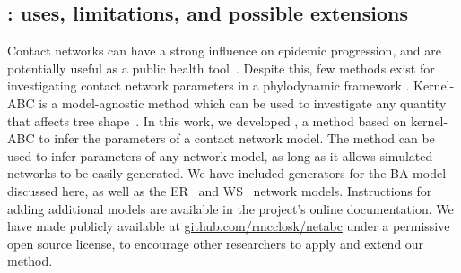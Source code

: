 
\label{sec:disc}

\subsection{: uses, limitations, and possible extensions}


Contact networks can have a strong influence on epidemic progression, and are
potentially useful as a public health tool~\autocite{wang2015targeting,
little2014using}. Despite this, few methods exist for investigating contact
network parameters in a phylodynamic framework \autocite[although see][for
related work]{groendyke2011bayesian, volz2008sir, brown2011transmission,
leventhal2012inferring, greenbaum2016inference}. Kernel-ABC is a model-agnostic
method which can be used to investigate any quantity that affects tree
shape~\autocite{poon2015phylodynamic}. In this work, we developed
, a method based on kernel-ABC to infer the parameters of a
contact network model. The method  can be used
to infer parameters of any network model, as long as it allows simulated
networks to be easily generated. We have included generators for the \gls{BA}
model discussed here, as well as the \gls{ER}~\autocite{erdos1960evolution} and
\gls{WS}~\autocite{watts1998collective} network models.  Instructions for
adding additional models are available in the project's online documentation.
We have made  publicly available at
\url{github.com/rmcclosk/netabc} under a permissive open source license, to
encourage other researchers to apply and extend our method.

